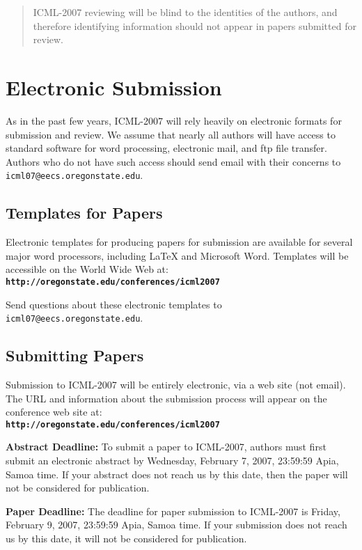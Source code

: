 \documentclass{article}
\begin{document}
\begin{abstract} 
ICML-2007 reviewing will be blind to the identities of the authors,
and therefore identifying information should not 
appear in papers submitted for review.
\end{abstract} 

\section{Electronic Submission}
\label{submission}

As in the past few years,
ICML-2007 will rely heavily on electronic formats for submission and 
review. We assume that nearly all authors will have access to standard
software for word processing, electronic mail, and ftp file transfer. 
Authors who do not have such access should send email with their concerns 
to \texttt{icml07@eecs.oregonstate.edu}.

\subsection{Templates for Papers}

Electronic templates for producing papers for submission are available
for several major word processors, including \LaTeX\/ and Microsoft Word. 
Templates will be accessible on the World Wide Web at:\\
\textbf{\texttt{http://oregonstate.edu/conferences/icml2007}}

\noindent
Send questions about these electronic templates to
\texttt{icml07@eecs.oregonstate.edu}.

\subsection{Submitting Papers}

Submission to ICML-2007 will be entirely electronic, via a web site
(not email).  The URL and information about the submission process
will appear on the conference web site at:\\
\textbf{\texttt{http://oregonstate.edu/conferences/icml2007}}

{\bf Abstract Deadline:} To submit a paper to ICML-2007, authors must
first submit an electronic abstract by Wednesday, February 7, 2007,
23:59:59 Apia, Samoa time.
If your abstract does not reach us by this date, then the paper will not be
considered for publication.

{\bf Paper Deadline:} The deadline for paper submission to ICML-2007 is 
Friday, February 9, 2007, 23:59:59 Apia, Samoa time. 
If your submission does not reach us by this date, it will not be
considered for publication.
\end{document}
